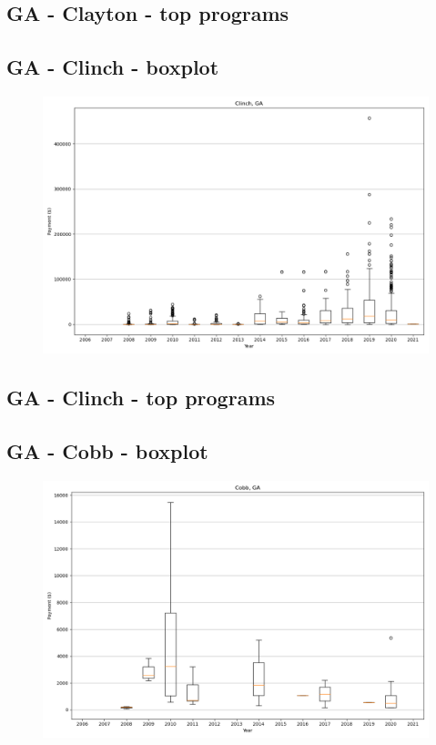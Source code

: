 \subsection*{GA - Clayton - top programs}

\newpage
\subsection*{GA - Clinch - boxplot}
\begin{figure}[h]
\centering
\includegraphics[width=7in]{../output/boxplots/counties/Clinch-GA_boxplot.png}
\end{figure}


\subsection*{GA - Clinch - top programs}

\newpage
\subsection*{GA - Cobb - boxplot}
\begin{figure}[h]
\centering
\includegraphics[width=7in]{../output/boxplots/counties/Cobb-GA_boxplot.png}
\end{figure}



